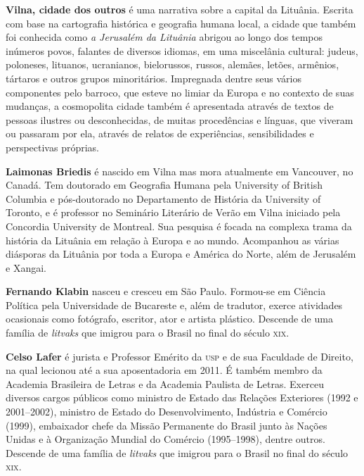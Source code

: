 \textbf{Vilna, cidade dos outros} é uma narrativa sobre a capital da Lituânia. Escrita com base na cartografia histórica e geografia humana local, a cidade que também foi conhecida como \textit{a Jerusalém da Lituânia} abrigou ao longo dos tempos inúmeros povos, falantes de diversos idiomas, em uma miscelânia cultural: judeus, poloneses, lituanos, ucranianos, bielorussos, russos, alemães, letões, armênios, tártaros e outros grupos minoritários. Impregnada dentre seus vários componentes pelo barroco, que esteve no limiar da Europa e no contexto de suas mudanças, a cosmopolita cidade também é apresentada através de textos de pessoas ilustres ou desconhecidas, de muitas procedências e línguas, que viveram ou passaram por ela, através de relatos de experiências, sensibilidades e perspectivas próprias.

\textbf{Laimonas Briedis} é nascido em Vilna mas mora atualmente em Vancouver, no Canadá. Tem doutorado em Geografia Humana pela University of British Columbia e pós-doutorado no Departamento de História da University of Toronto, e é professor no Seminário Literário de Verão em Vilna iniciado pela Concordia University de Montreal. Sua pesquisa é focada na complexa trama da história da Lituânia em relação à Europa e ao mundo. Acompanhou as várias diásporas da Lituânia por toda a Europa e América do Norte, além de Jerusalém e Xangai.

\textbf{Fernando Klabin} nasceu e cresceu em São Paulo. Formou-se em Ciência Política pela Universidade de Bucareste e, além de tradutor, exerce atividades ocasionais como fotógrafo, escritor, ator e artista plástico. Descende de uma família de \textit{litvaks} que imigrou para o Brasil no final do século \textsc{xix}.

\textbf{Celso Lafer} é jurista e Professor Emérito da \textsc{usp} e de sua Faculdade de Direito, na qual lecionou até a sua aposentadoria em 2011. É também membro da Academia Brasileira de Letras e da Academia Paulista de Letras. Exerceu diversos cargos públicos como ministro de Estado das Relações Exteriores (1992 e 2001--2002), ministro de Estado do Desenvolvimento, Indústria e Comércio (1999), embaixador chefe da Missão Permanente do Brasil junto às Nações Unidas e à Organização Mundial do Comércio (1995--1998), dentre outros. Descende de uma família de \textit{litvaks} que imigrou para o Brasil no final do século \textsc{xix}.




